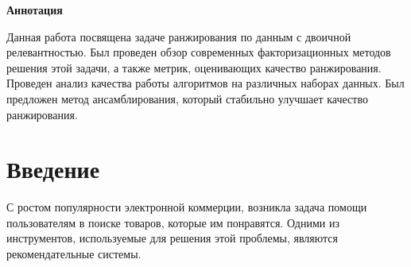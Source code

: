 \documentclass[14pt]{extarticle}
\begin{document}
%
%
%
%
%


\tableofcontents %
\newpage

\begin{center}\textbf{Аннотация} \end{center}
Данная работа посвящена задаче ранжирования по данным с двоичной релевантностью. Был проведен обзор современных факторизационных методов  решения этой задачи, а также  метрик, оценивающих качество ранжирования.  Проведен анализ качества работы алгоритмов на различных наборах данных. Был предложен метод ансамблирования, который стабильно улучшает качество ранжирования. 
\newpage

\section{Введение}


С ростом популярности электронной коммерции, возникла задача помощи пользователям в поиске товаров, которые им понравятся. Одними из инструментов, используемые для решения этой проблемы, являются рекомендательные системы. 
\end{document}
